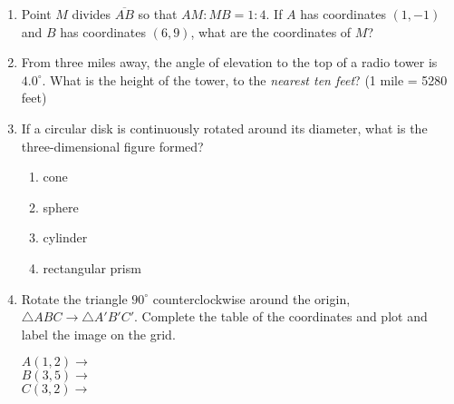 \documentclass[12pt, oneside]{article}
\begin{document}
\begin{enumerate}[itemsep=1.2cm]
\item Point $M$ divides $\overline{AB}$ so that $AM:MB = 1:4$. If $A$ has coordinates $(1,-1)$ and $B$ has coordinates $(6,9)$, what are the coordinates of $M$?

\item From three miles away, the angle of elevation to the top of a radio tower is $4.0^\circ$. What is the height of the tower, to the \emph{nearest ten feet}? (1 mile = 5280 feet)
  \begin{center}
  \end{center}

\item If a circular disk is continuously rotated around its diameter, what is the three-dimensional figure formed?
  \begin{multicols}{2}
  \begin{enumerate}
    \item cone
    \item sphere
    \item cylinder
    \item rectangular prism
  \end{enumerate}
\end{multicols}

\newpage
\item Rotate the triangle $90^\circ$ counterclockwise around the origin, $\triangle ABC \rightarrow \triangle A'B'C'$. Complete the table of the coordinates and plot and label the image on the grid. \vspace{0.25cm}
  \begin{multicols}{2}
    $A(1,2) \rightarrow$ \\[0.7cm]
    $B(3,5) \rightarrow$ \\[0.7cm]
    $C(3,2) \rightarrow$ \\[0.7cm]
    \end{multicols}
    

\end{enumerate}
\end{document}
